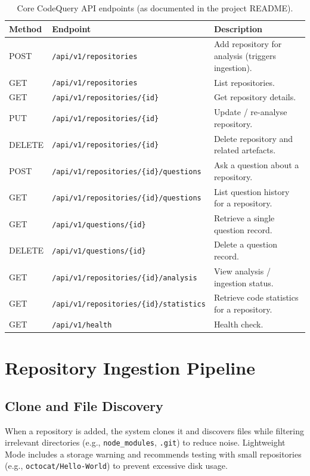 \documentclass[11pt,a4paper]{article}
\begin{document}
\begin{table}[h]
\centering
\small
\begin{tabular}{@{}llp{9.2cm}@{}}
\toprule
\textbf{Method} & \textbf{Endpoint} & \textbf{Description} \\
\midrule
POST & \texttt{/api/v1/repositories} & Add repository for analysis (triggers ingestion). \\
GET & \texttt{/api/v1/repositories} & List repositories. \\
GET & \texttt{/api/v1/repositories/\{id\}} & Get repository details. \\
PUT & \texttt{/api/v1/repositories/\{id\}} & Update / re-analyse repository. \\
DELETE & \texttt{/api/v1/repositories/\{id\}} & Delete repository and related artefacts. \\
POST & \texttt{/api/v1/repositories/\{id\}/questions} & Ask a question about a repository. \\
GET & \texttt{/api/v1/repositories/\{id\}/questions} & List question history for a repository. \\
GET & \texttt{/api/v1/questions/\{id\}} & Retrieve a single question record. \\
DELETE & \texttt{/api/v1/questions/\{id\}} & Delete a question record. \\
GET & \texttt{/api/v1/repositories/\{id\}/analysis} & View analysis / ingestion status. \\
GET & \texttt{/api/v1/repositories/\{id\}/statistics} & Retrieve code statistics for a repository. \\
GET & \texttt{/api/v1/health} & Health check. \\
\bottomrule
\end{tabular}
\caption{Core CodeQuery API endpoints (as documented in the project README).}
\label{tab:endpoints}
\end{table}

\section{Repository Ingestion Pipeline}

\subsection{Clone and File Discovery}
When a repository is added, the system clones it and discovers files while filtering irrelevant directories (e.g., \texttt{node\_modules}, \texttt{.git}) to reduce noise. Lightweight Mode includes a storage warning and recommends testing with small repositories (e.g., \texttt{octocat/Hello-World}) to prevent excessive disk usage.
\end{document}
